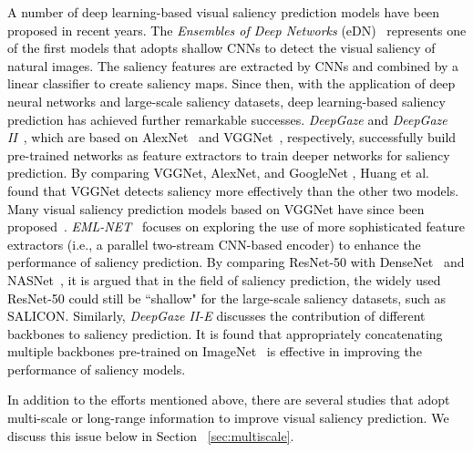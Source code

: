 \documentclass{article}
\begin{document}
\textcolor{black}{A number of deep learning-based visual saliency prediction models have been proposed in recent years.
The \textit{Ensembles of Deep Networks} (eDN)~\cite{eDN} represents one of the first models that adopts shallow CNNs to detect the visual saliency of natural images. The saliency features are extracted by CNNs and combined by a linear classifier to create saliency maps. Since then, with the application of deep neural networks and large-scale saliency datasets, deep learning-based saliency prediction has achieved further remarkable successes.
\textit{DeepGaze} and \textit{DeepGaze II}~\cite{DeepGaze2}, which are based on AlexNet~\cite{AlexNet} and VGGNet~\cite{VGG}, respectively, successfully build pre-trained networks as feature extractors to train deeper networks for saliency prediction. 
By comparing VGGNet, AlexNet, and GoogleNet \cite{GoogleNet}, Huang et al.~\cite{Huang_2015} found that VGGNet detects saliency more effectively than the other two models.
Many visual saliency prediction models based on VGGNet have since been proposed~\cite{ML-Net,DVA_Wang,MSI-Net}.
\textit{EML-NET}~\cite{EML-NET} focuses on exploring the use of more sophisticated feature extractors (i.e., a parallel two-stream CNN-based encoder) to enhance the performance of saliency prediction. By comparing ResNet-50 with DenseNet~\cite{DenseNet} and NASNet~\cite{NASNet}, it is argued that in the field of saliency prediction, the widely used ResNet-50 could still be ``shallow" for the large-scale saliency datasets, such as SALICON. Similarly, \textit{DeepGaze II-E} discusses the contribution of different backbones to saliency prediction. It is found that appropriately concatenating multiple backbones pre-trained on ImageNet~\cite{imagenet} is effective in improving the performance of saliency models.}

\textcolor{black}{
In addition to the efforts mentioned above, there are several studies that adopt multi-scale or long-range information to improve visual saliency prediction. We discuss this issue below in Section ~\ref{sec:multiscale}.
}
\end{document}

